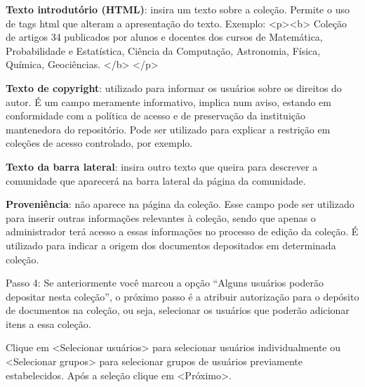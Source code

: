 \documentclass[12pt,hidelinks]{article}
\begin{document}
    \singlespacing
     
    \textbullet \hspace{6pt} \textbf{Texto introdutório (HTML)}: insira um texto sobre a coleção. Permite o uso de tags html que alteram a apresentação do texto. Exemplo: <p><b> Coleção de artigos 34 publicados por alunos e docentes dos cursos de Matemática, Probabilidade e Estatística, Ciência da Computação, Astronomia, Física, Química, Geociências. </b> </p>
    
    \singlespacing
     
    \textbullet \hspace{6pt} \textbf{Texto de copyright}: utilizado para informar os usuários sobre os direitos do autor. É um campo meramente informativo, implica num aviso, estando em conformidade com a política de acesso e de preservação da instituição mantenedora do repositório. Pode ser utilizado para explicar a restrição em coleções de acesso controlado, por exemplo.
    
    \singlespacing
     
    \textbullet \hspace{6pt} \textbf{Texto da barra lateral}: insira outro texto que queira para descrever a comunidade que aparecerá na barra lateral da página da comunidade.
    
    \singlespacing
     
    \textbullet \hspace{6pt} \textbf{Proveniência}: não aparece na página da coleção. Esse campo pode ser utilizado para inserir outras informações relevantes à coleção, sendo que apenas o administrador terá acesso a essas informações no processo de edição da coleção. É utilizado para indicar a origem dos documentos depositados em determinada coleção.
    
    \singlespacing
    
    Passo 4: Se anteriormente você marcou a opção “Alguns usuários poderão depositar nesta coleção”, o próximo passo é a atribuir autorização para o depósito de documentos na coleção, ou seja, selecionar os usuários que poderão adicionar itens a essa coleção.
    
    Clique em <Selecionar usuários> para selecionar usuários individualmente ou <Selecionar grupos> para selecionar grupos de usuários previamente estabelecidos. Após a seleção clique em <Próximo>.
    
\end{document}
